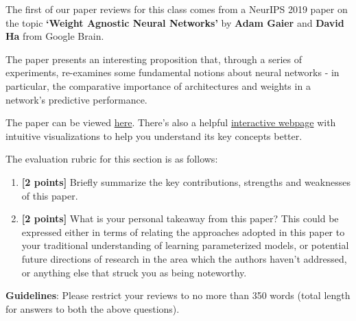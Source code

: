 
The first of our paper reviews for this class comes from a NeurIPS 2019 paper on the topic \textbf{`Weight Agnostic Neural Networks'} by \textbf{Adam Gaier} and \textbf{David Ha} from Google Brain.

The paper presents an interesting proposition that, through a series of experiments, re-examines some fundamental notions about neural networks - in particular, the comparative importance of architectures and weights in a network's predictive performance. 

The paper can be viewed \href{https://arxiv.org/abs/1906.04358}{here}.
There's also a helpful \href{https://weightagnostic.github.io/}{interactive webpage} with intuitive visualizations to help you understand its key concepts better. 

The evaluation rubric for this section is as follows:

\begin{enumerate}[resume]
\item
\textbf{[2 points]}
Briefly summarize the key contributions, strengths and weaknesses of this paper.

\item
\textbf{[2 points]}
What is your personal takeaway from this paper? This could be expressed either in terms of relating the approaches adopted in this paper to your traditional understanding of learning parameterized models, or potential future directions of research in the area which the authors haven't addressed, or anything else that struck you as being noteworthy. 
\end{enumerate}

\textbf{Guidelines}: Please restrict your reviews to no more than 350 words (total length for answers to both the above questions).